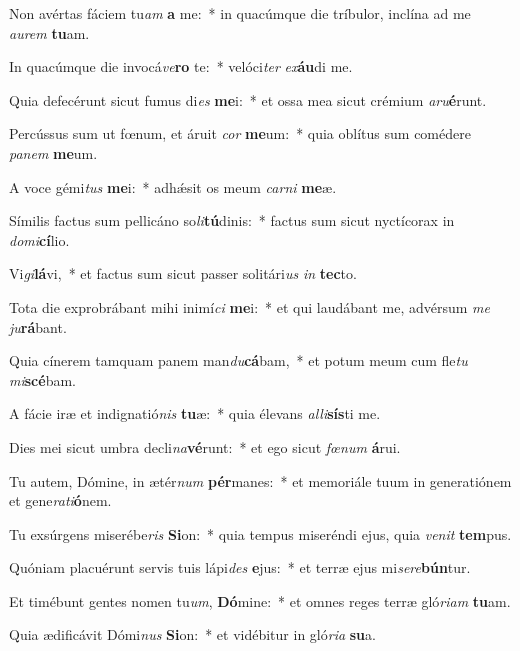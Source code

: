 \item Non avértas fáciem tu\textit{am} \textbf{a} me:~* in quacúmque die tríbulor, inclína ad me \textit{au}\textit{rem} \textbf{tu}am.
\item In quacúmque die invocá\textit{ve}\textbf{ro} te:~* velóci\textit{ter} \textit{ex}\textbf{áu}di me.
\item Quia defecérunt sicut fumus di\textit{es} \textbf{me}i:~* et ossa mea sicut crémium \textit{a}\textit{ru}\textbf{é}runt.
\item Percússus sum ut fœnum, et áruit \textit{cor} \textbf{me}um:~* quia oblítus sum comédere \textit{pa}\textit{nem} \textbf{me}um.
\item A voce gémi\textit{tus} \textbf{me}i:~* adhǽsit os meum \textit{car}\textit{ni} \textbf{me}æ.
\item Símilis factus sum pellicáno so\textit{li}\textbf{tú}dinis:~* factus sum sicut nyctícorax in \textit{do}\textit{mi}\textbf{cí}lio.
\item Vi\textit{gi}\textbf{lá}vi,~* et factus sum sicut passer solitári\textit{us} \textit{in} \textbf{tec}to.
\item Tota die exprobrábant mihi inimí\textit{ci} \textbf{me}i:~* et qui laudábant me, advérsum \textit{me} \textit{ju}\textbf{rá}bant.
\item Quia cínerem tamquam panem man\textit{du}\textbf{cá}bam,~* et potum meum cum fle\textit{tu} \textit{mi}\textbf{scé}bam.
\item A fácie iræ et indignatió\textit{nis} \textbf{tu}æ:~* quia élevans \textit{al}\textit{li}\textbf{sís}ti me.
\item Dies mei sicut umbra decli\textit{na}\textbf{vé}runt:~* et ego sicut \textit{fœ}\textit{num} \textbf{á}rui.
\item Tu autem, Dómine, in ætér\textit{num} \textbf{pér}manes:~* et memoriále tuum in generatiónem et gene\textit{ra}\textit{ti}\textbf{ó}nem.
\item Tu exsúrgens miserébe\textit{ris} \textbf{Si}on:~* quia tempus miseréndi ejus, quia \textit{ve}\textit{nit} \textbf{tem}pus.
\item Quóniam placuérunt servis tuis lápi\textit{des} \textbf{e}jus:~* et terræ ejus mi\textit{se}\textit{re}\textbf{bún}tur.
\item Et timébunt gentes nomen tu\textit{um}, \textbf{Dó}mine:~* et omnes reges terræ gló\textit{ri}\textit{am} \textbf{tu}am.
\item Quia ædificávit Dómi\textit{nus} \textbf{Si}on:~* et vidébitur in gló\textit{ri}\textit{a} \textbf{su}a.
